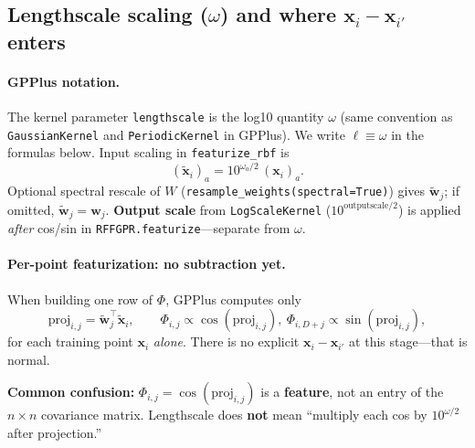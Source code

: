 \documentclass[11pt]{article}
\newcommand{\Ph}{\Phi}
\begin{document}
\subsection{Lengthscale scaling ($\omega$) and where $\mathbf x_i-\mathbf x_{i'}$ enters}
\label{sec:lengthscale-proj}

\paragraph{GPPlus notation.}
The kernel parameter \texttt{lengthscale} is the log10 quantity $\omega$ (same convention as
\texttt{GaussianKernel} and \texttt{PeriodicKernel} in GPPlus).
We write $\ell\equiv\omega$ in the formulas below.
Input scaling in \texttt{featurize\_rbf} is
\begin{equation}
  \label{eq:x-tilde}
  (\tilde{\mathbf x}_i)_a = 10^{\omega_a/2}\,(\mathbf x_i)_a.
\end{equation}
Optional spectral rescale of $W$ (\texttt{resample\_weights(spectral=True)}) gives $\tilde{\mathbf w}_j$;
if omitted, $\tilde{\mathbf w}_j=\mathbf w_j$.
\textbf{Output scale} from \texttt{LogScaleKernel} ($10^{\text{outputscale}/2}$) is applied
\emph{after} cos/sin in \texttt{RFFGPR.featurize}---separate from $\omega$.

\paragraph{Per-point featurization: no subtraction yet.}
When building one row of $\Ph$, GPPlus computes only
\[
  \mathrm{proj}_{i,j}=\tilde{\mathbf w}_j^{\top}\tilde{\mathbf x}_i,
  \qquad
  \Ph_{i,j}\propto \cos(\mathrm{proj}_{i,j}),\ \Ph_{i,D+j}\propto \sin(\mathrm{proj}_{i,j}),
\]
for each training point $\mathbf x_i$ \emph{alone}.
There is no explicit $\mathbf x_i-\mathbf x_{i'}$ at this stage---that is normal.

\begin{diffbox}
\textbf{Common confusion:} $\Ph_{i,j}=\cos(\mathrm{proj}_{i,j})$ is a \textbf{feature}, not an entry of the
$n\times n$ covariance matrix. Lengthscale does \textbf{not} mean ``multiply each cos by $10^{\omega/2}$ after projection.''
\end{diffbox}
\end{document}
